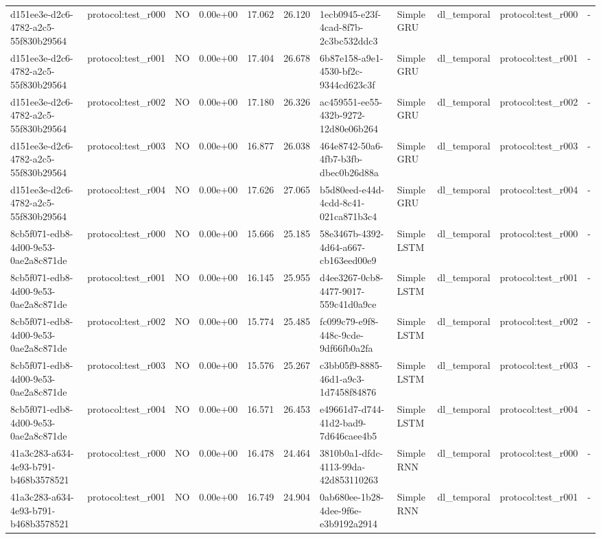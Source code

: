 \begin{table}[htbp]
\begin{tabular}{llrrr}
d151ee3e-d2c6-4782-a2c5-55f830b29564 & protocol:test\_r000 & NO & 0.00e+00 & 17.062 & 26.120 & 1ecb0945-e23f-4cad-8f7b-2c3bc532ddc3 & Simple GRU & dl\_temporal & protocol:test\_r000 & - \\
d151ee3e-d2c6-4782-a2c5-55f830b29564 & protocol:test\_r001 & NO & 0.00e+00 & 17.404 & 26.678 & 6b87e158-a9e1-4530-bf2c-9344cd623c3f & Simple GRU & dl\_temporal & protocol:test\_r001 & - \\
d151ee3e-d2c6-4782-a2c5-55f830b29564 & protocol:test\_r002 & NO & 0.00e+00 & 17.180 & 26.326 & ac459551-ee55-432b-9272-12d80e06b264 & Simple GRU & dl\_temporal & protocol:test\_r002 & - \\
d151ee3e-d2c6-4782-a2c5-55f830b29564 & protocol:test\_r003 & NO & 0.00e+00 & 16.877 & 26.038 & 464e8742-50a6-4fb7-b3fb-dbec0b26d88a & Simple GRU & dl\_temporal & protocol:test\_r003 & - \\
d151ee3e-d2c6-4782-a2c5-55f830b29564 & protocol:test\_r004 & NO & 0.00e+00 & 17.626 & 27.065 & b5d80eed-e44d-4cdd-8c41-021ca871b3c4 & Simple GRU & dl\_temporal & protocol:test\_r004 & - \\
8cb5f071-edb8-4d00-9e53-0ae2a8c871de & protocol:test\_r000 & NO & 0.00e+00 & 15.666 & 25.185 & 58e3467b-4392-4d64-a667-cb163eed00e9 & Simple LSTM & dl\_temporal & protocol:test\_r000 & - \\
8cb5f071-edb8-4d00-9e53-0ae2a8c871de & protocol:test\_r001 & NO & 0.00e+00 & 16.145 & 25.955 & d4ee3267-0cb8-4477-9017-559c41d0a9ce & Simple LSTM & dl\_temporal & protocol:test\_r001 & - \\
8cb5f071-edb8-4d00-9e53-0ae2a8c871de & protocol:test\_r002 & NO & 0.00e+00 & 15.774 & 25.485 & fc099c79-e9f8-448c-9cde-9df66fb0a2fa & Simple LSTM & dl\_temporal & protocol:test\_r002 & - \\
8cb5f071-edb8-4d00-9e53-0ae2a8c871de & protocol:test\_r003 & NO & 0.00e+00 & 15.576 & 25.267 & c3bb05f9-8885-46d1-a9c3-1d7458f84876 & Simple LSTM & dl\_temporal & protocol:test\_r003 & - \\
8cb5f071-edb8-4d00-9e53-0ae2a8c871de & protocol:test\_r004 & NO & 0.00e+00 & 16.571 & 26.453 & e49661d7-d744-41d2-bad9-7d646caee4b5 & Simple LSTM & dl\_temporal & protocol:test\_r004 & - \\
41a3c283-a634-4e93-b791-b468b3578521 & protocol:test\_r000 & NO & 0.00e+00 & 16.478 & 24.464 & 3810b0a1-dfdc-4113-99da-42d853110263 & Simple RNN & dl\_temporal & protocol:test\_r000 & - \\
41a3c283-a634-4e93-b791-b468b3578521 & protocol:test\_r001 & NO & 0.00e+00 & 16.749 & 24.904 & 0ab680ee-1b28-4dee-9f6e-e3b9192a2914 & Simple RNN & dl\_temporal & protocol:test\_r001 & - \\

\end{tabular}
\end{table}
